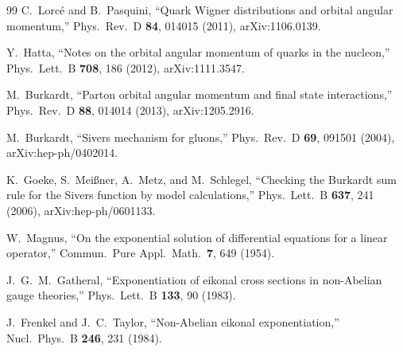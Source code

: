 \documentclass[11pt]{article}
\begin{document}
\begin{thebibliography}{99}
C.~Lorc\'e and B.~Pasquini,
``Quark Wigner distributions and orbital angular momentum,''
Phys.\ Rev.\ D \textbf{84}, 014015 (2011), arXiv:1106.0139.

Y.~Hatta,
``Notes on the orbital angular momentum of quarks in the nucleon,''
Phys.\ Lett.\ B \textbf{708}, 186 (2012), arXiv:1111.3547.

M.~Burkardt,
``Parton orbital angular momentum and final state interactions,''
Phys.\ Rev.\ D \textbf{88}, 014014 (2013), arXiv:1205.2916.

M.~Burkardt,
``Sivers mechanism for gluons,''
Phys.\ Rev.\ D \textbf{69}, 091501 (2004), arXiv:hep-ph/0402014.

K.~Goeke, S.~Mei{\ss}ner, A.~Metz, and M.~Schlegel,
``Checking the Burkardt sum rule for the Sivers function by model
calculations,''
Phys.\ Lett.\ B \textbf{637}, 241 (2006), arXiv:hep-ph/0601133.

W.~Magnus,
``On the exponential solution of differential equations for a linear
operator,''
Commun.\ Pure Appl.\ Math.\ \textbf{7}, 649 (1954).

J.~G.~M.~Gatheral,
``Exponentiation of eikonal cross sections in non-Abelian gauge theories,''
Phys.\ Lett.\ B \textbf{133}, 90 (1983).

J.~Frenkel and J.~C.~Taylor,
``Non-Abelian eikonal exponentiation,''
Nucl.\ Phys.\ B \textbf{246}, 231 (1984).

\end{thebibliography}
\end{document}
